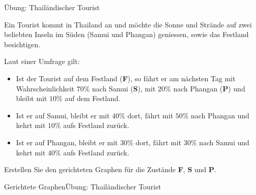 \begin{frame}{Übung: Thailändischer Tourist}
    \begin{myexercise}
        \small
        Ein Tourist kommt in Thailand an und möchte die Sonne und Strände auf zwei beliebten Inseln im Süden (Samui und Phangan) geniessen, sowie das Festland besichtigen.

        Laut einer Umfrage gilt:
        \begin{itemize}
            \item Ist der Tourist auf dem Festland (\textbf{F}), so fährt er am nächsten Tag mit Wahrscheinlichkeit $70\%$ nach Samui (\textbf{S}), mit $20\%$ nach Phangan (\textbf{P}) und bleibt mit $10\%$ auf dem Festland.
            \item Ist er auf Samui, bleibt er mit $40\%$ dort, fährt mit $50\%$ nach Phangan und kehrt mit $10\%$ aufs Festland zurück.
            \item Ist er auf Phangan, bleibt er mit $30\%$ dort, fährt mit $30\%$ nach Samui und kehrt mit $40\%$ aufs Festland zurück.
        \end{itemize}
        Erstellen Sie den gerichteten Graphen für die Zustände \textbf{F}, \textbf{S} und \textbf{P}.
    \end{myexercise}
\end{frame}

\begin{frame}{Gerichtete Graphen}{Übung: Thailändischer Tourist}
    \begin{figure}[H]
        \centering
    \end{figure}
    \begin{center}
    \end{center}
\end{frame}

